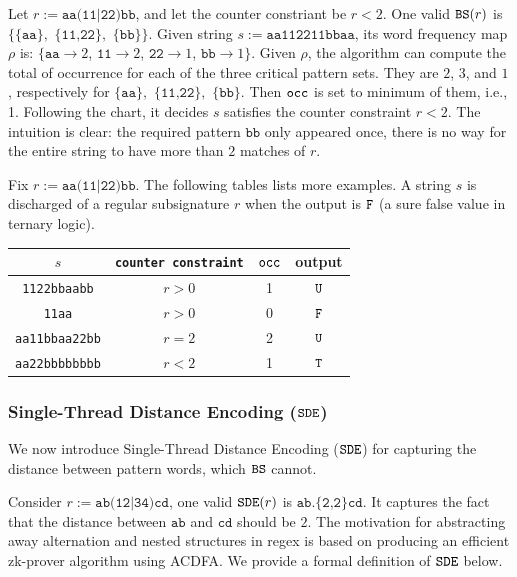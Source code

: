 \begin{example} 
Let $r := \texttt{aa(11|22)bb}$, and let the
counter constriant be $r < 2$. 
One valid $\texttt{BS}(r)$ is 
$\{\{\texttt{aa}\},$ $\{\texttt{11,22}\},$ $\{\texttt{bb}\}\}$.
Given string $s := \texttt{aa112211bbaa}$, its word frequency
map $\rho$ is: 
$\{\texttt{aa} \rightarrow 2$,
$\texttt{11} \rightarrow 2$,
$\texttt{22} \rightarrow 1$,
$\texttt{bb} \rightarrow 1\}$. Given $\rho$, the algorithm
can compute the total of occurrence for each of the three
critical pattern sets. They are $2$, $3$, and $1$, respectively
for $\{\texttt{aa}\},$ $\{\texttt{11,22}\},$ $\{\texttt{bb}\}$.
Then $\texttt{occ}$ is set to minimum of them, i.e., 1.
Following the chart, it decides $s$ satisfies the counter constraint
$r < 2$. The intuition is clear: the required pattern
$\texttt{bb}$ only appeared once, there is no way for the entire string
to have more than $2$ matches of $r$.

Fix $r := \texttt{aa(11|22)bb}$. The following tables lists more examples.
A string $s$ is discharged of a regular subsignature $r$ when
the output is $\texttt{F}$ (a sure false value in ternary logic).

\begin{small}
\begin{center}
\begin{tabular}{c | c | c | c}
\hline
$s$ & \texttt{counter constraint} & $\texttt{occ}$ & output \\
\hline
\hline
\texttt{1122bbaabb} & $r>0$ & 1 & $\texttt{U}$ \\
\texttt{11aa} & $r>0$ & 0 & $\texttt{F}$ \\
\texttt{aa11bbaa22bb} & $r=2$ & 2 & $\texttt{U}$ \\
\texttt{aa22bbbbbbbb} & $r<2$ & 1 & $\texttt{T}$ \\
\hline
\end{tabular}
\end{center}
\end{small}

\end{example}

\subsubsection{Single-Thread Distance Encoding ($\texttt{SDE}$)}
We now introduce Single-Thread Distance Encoding ($\texttt{SDE}$) for 
capturing the distance between pattern words, which $\texttt{BS}$ cannot. 

Consider $r := \texttt{ab(12|34)cd}$, one valid $\texttt{SDE}(r)$ is
$\texttt{ab.\{2,2\}cd}$. It captures the fact that the distance between
$\texttt{ab}$ and $\texttt{cd}$ should be $2$. The motivation
for abstracting away alternation and nested structures in regex 
is based on producing an efficient zk-prover algorithm using ACDFA.
We provide a formal definition of $\texttt{SDE}$ below.

